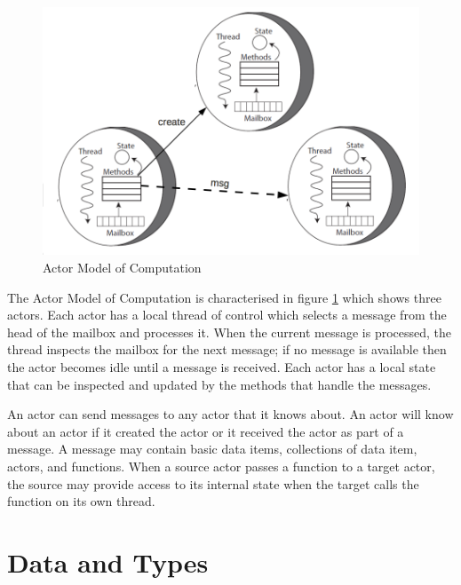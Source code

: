 \documentclass[5p,times]{elsarticle}
\begin{document}
\begin{figure}
\centering
\includegraphics[width=\columnwidth]{actors}
\vspace{-0.20cm}
\caption{Actor Model of Computation \cite{karmani2009actor}}
\label{fig:actors}
\end{figure}

The Actor Model of Computation is characterised in figure \ref{fig:actors} which shows three actors. Each actor has a local thread of control which selects a message from the head of the mailbox and processes it. When the current message is processed, the thread inspects the mailbox for the next message; if no message is available then the actor becomes idle until a message is received. Each actor has a local state that can be inspected and updated by the methods that handle the messages.

An actor can send messages to any actor that it knows about. An actor will know about an actor if it created the actor or it received the actor as part of a message. A message may contain basic data items, collections of data item, actors, and functions. When a source actor passes a function to a target actor, the source may provide access to its internal state when the target calls the function on its own thread.




\section{Data and Types}

\label{sec:data}
\end{document}
